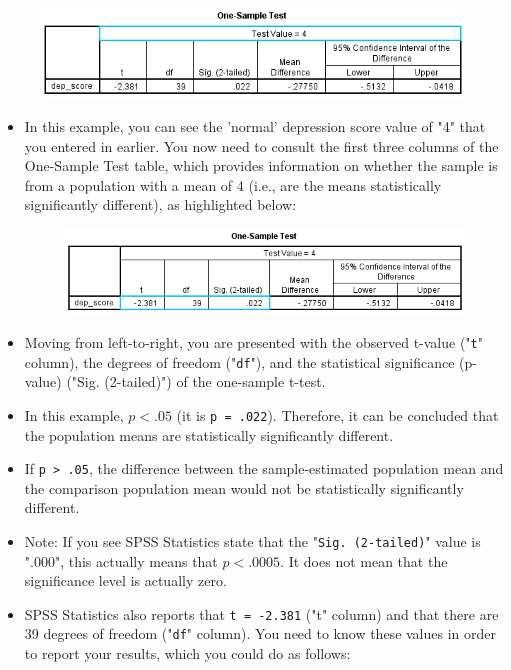 \documentclass[]{article}
\begin{document}
\begin{figure}[h!]
	\centering
	\includegraphics[width=0.7\linewidth]{OneSample/OneSample-DescriptiveStatistics2}
	\caption{}
	\label{fig:OneSample-DescriptiveStatistics2}
\end{figure}
\begin{itemize}
	\item In this example, you can see the 'normal' depression score value of "4" that you entered in earlier. You now need to consult the first three columns of the One-Sample Test table, which provides information on whether the sample is from a population with a mean of 4 (i.e., are the means statistically significantly different), as highlighted below:


\begin{figure}[h!]
	\centering
	\includegraphics[width=0.7\linewidth]{OneSample/OneSample-DescriptiveStatistics3}
	\caption{}
	\label{fig:OneSample-DescriptiveStatistics3}
\end{figure}
\item Moving from left-to-right, you are presented with the observed t-value ("\texttt{t}" column), the degrees of freedom ("\texttt{df}"), and the statistical significance (p-value) ("Sig. (2-tailed)") of the one-sample t-test. 
\item In this example, $p < .05$ (it is \texttt{p = .022}). Therefore, it can be concluded that the population means are statistically significantly different. 
\item If \texttt{p > .05}, the difference between the sample-estimated population mean and the comparison population mean would not be statistically significantly different.

\item Note: If you see SPSS Statistics state that the "\texttt{Sig. (2-tailed)}" value is ".000", this actually means that $p < .0005$. It does not mean that the significance level is actually zero.

\item SPSS Statistics also reports that \texttt{t = -2.381} ("t" column) and that there are 39 degrees of freedom ("\texttt{df}" column). You need to know these values in order to report your results, which you could do as follows:
\end{itemize}
\end{document}
